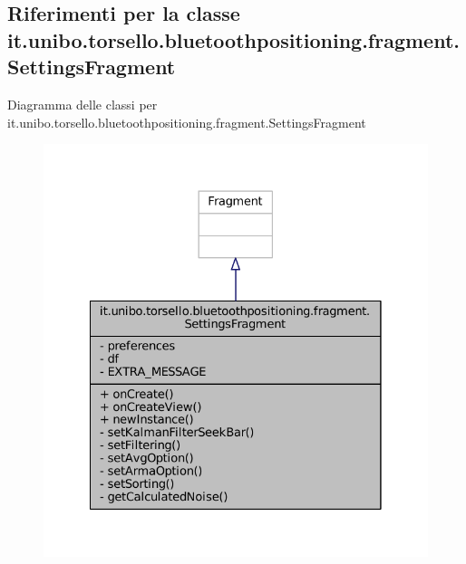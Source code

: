 \hypertarget{classit_1_1unibo_1_1torsello_1_1bluetoothpositioning_1_1fragment_1_1SettingsFragment}{}\subsection{Riferimenti per la classe it.\+unibo.\+torsello.\+bluetoothpositioning.\+fragment.\+Settings\+Fragment}
\label{classit_1_1unibo_1_1torsello_1_1bluetoothpositioning_1_1fragment_1_1SettingsFragment}


Diagramma delle classi per it.\+unibo.\+torsello.\+bluetoothpositioning.\+fragment.\+Settings\+Fragment
\nopagebreak
\begin{figure}[H]
\begin{center}
\leavevmode
\includegraphics[width=328pt]{classit_1_1unibo_1_1torsello_1_1bluetoothpositioning_1_1fragment_1_1SettingsFragment__inherit__graph}
\end{center}
\end{figure}


